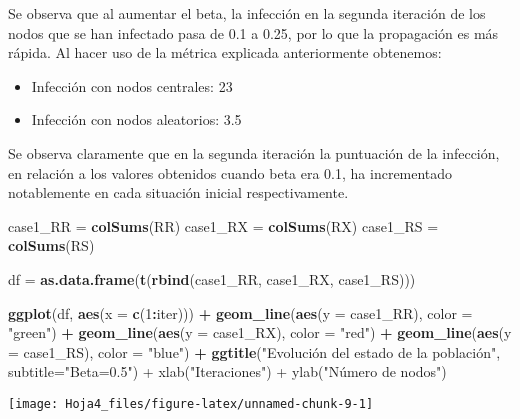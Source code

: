 \documentclass[
]{article}
\newenvironment{Shaded}{\begin{snugshade}}{\end{snugshade}}
\newcommand{\DataTypeTok}[1]{\textcolor[rgb]{0.13,0.29,0.53}{#1}}
\newcommand{\DecValTok}[1]{\textcolor[rgb]{0.00,0.00,0.81}{#1}}
\newcommand{\FloatTok}[1]{\textcolor[rgb]{0.00,0.00,0.81}{#1}}
\newcommand{\KeywordTok}[1]{\textcolor[rgb]{0.13,0.29,0.53}{\textbf{#1}}}
\newcommand{\NormalTok}[1]{#1}
\newcommand{\OperatorTok}[1]{\textcolor[rgb]{0.81,0.36,0.00}{\textbf{#1}}}
\newcommand{\StringTok}[1]{\textcolor[rgb]{0.31,0.60,0.02}{#1}}
\begin{document}
Se observa que al aumentar el beta, la infección en la segunda iteración
de los nodos que se han infectado pasa de 0.1 a 0.25, por lo que la
propagación es más rápida. Al hacer uso de la métrica explicada
anteriormente obtenemos:

\begin{itemize}
\item
  Infección con nodos centrales: 23
\item
  Infección con nodos aleatorios: 3.5
\end{itemize}

Se observa claramente que en la segunda iteración la puntuación de la
infección, en relación a los valores obtenidos cuando beta era 0.1, ha
incrementado notablemente en cada situación inicial respectivamente.

\begin{Shaded}
\begin{Highlighting}[]
\NormalTok{case1_RR =}\StringTok{ }\KeywordTok{colSums}\NormalTok{(RR)}
\NormalTok{case1_RX =}\StringTok{ }\KeywordTok{colSums}\NormalTok{(RX)}
\NormalTok{case1_RS =}\StringTok{ }\KeywordTok{colSums}\NormalTok{(RS)}

\NormalTok{df =}\StringTok{ }\KeywordTok{as.data.frame}\NormalTok{(}\KeywordTok{t}\NormalTok{(}\KeywordTok{rbind}\NormalTok{(case1_RR, case1_RX, case1_RS)))}

\KeywordTok{ggplot}\NormalTok{(df, }\KeywordTok{aes}\NormalTok{(}\DataTypeTok{x =} \KeywordTok{c}\NormalTok{(}\DecValTok{1}\OperatorTok{:}\NormalTok{iter))) }\OperatorTok{+}
\StringTok{  }\KeywordTok{geom_line}\NormalTok{(}\KeywordTok{aes}\NormalTok{(}\DataTypeTok{y =}\NormalTok{ case1_RR), }\DataTypeTok{color =} \StringTok{"green"}\NormalTok{) }\OperatorTok{+}
\StringTok{  }\KeywordTok{geom_line}\NormalTok{(}\KeywordTok{aes}\NormalTok{(}\DataTypeTok{y =}\NormalTok{ case1_RX), }\DataTypeTok{color =} \StringTok{"red"}\NormalTok{) }\OperatorTok{+}
\StringTok{  }\KeywordTok{geom_line}\NormalTok{(}\KeywordTok{aes}\NormalTok{(}\DataTypeTok{y =}\NormalTok{ case1_RS), }\DataTypeTok{color =} \StringTok{"blue"}\NormalTok{) }\OperatorTok{+}
\StringTok{  }\KeywordTok{ggtitle}\NormalTok{(}\StringTok{"Evolución del estado de la población", subtitle="}\DataTypeTok{Beta=}\FloatTok{0.5}\StringTok{") +}
\StringTok{  xlab("}\NormalTok{Iteraciones}\StringTok{") + ylab("}\NormalTok{Número de nodos}\StringTok{")}
\end{Highlighting}
\end{Shaded}

\begin{center}\texttt{[image: Hoja4\_files/figure-latex/unnamed-chunk-9-1]} \end{center}
\end{document}
